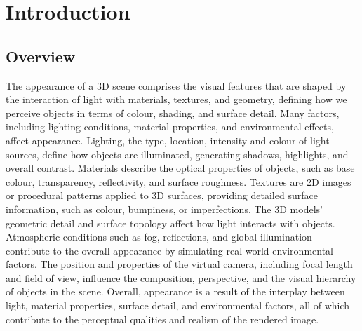 \chapter{Introduction}






\section{Overview} 

The appearance of a 3D scene comprises the visual features that are shaped by the interaction of light with materials, textures, and geometry, defining how we perceive objects in terms of colour, shading, and surface detail. Many factors, including lighting conditions, material properties, and environmental effects, affect appearance. Lighting, the type, location, intensity and colour of light sources, define how objects are illuminated, generating shadows, highlights, and overall contrast. Materials describe the optical properties of objects, such as base colour, transparency, reflectivity, and surface roughness. Textures are 2D images or procedural patterns applied to 3D surfaces, providing detailed surface information, such as colour, bumpiness, or imperfections. The 3D models' geometric detail and surface topology affect how light interacts with objects. Atmospheric conditions such as fog, reflections, and global illumination contribute to the overall appearance by simulating real-world environmental factors. The position and properties of the virtual camera, including focal length and field of view, influence the composition, perspective, and the visual hierarchy of objects in the scene. Overall, appearance is a result of the interplay between light, material properties, surface detail, and environmental factors, all of which contribute to the perceptual qualities and realism of the rendered image.

